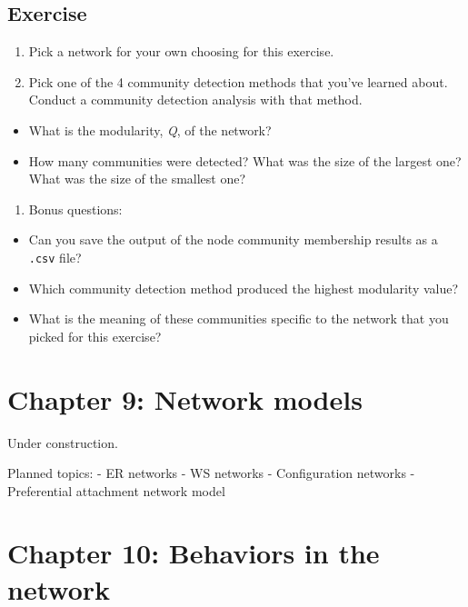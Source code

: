 \documentclass[
]{book}
\providecommand{\tightlist}{%
  \setlength{\itemsep}{0pt}\setlength{\parskip}{0pt}}
\begin{document}
\section{Exercise}\label{exercise-6}

\begin{enumerate}
\def\labelenumi{\arabic{enumi}.}
\item
  Pick a network for your own choosing for this exercise.
\item
  Pick one of the 4 community detection methods that you've learned about. Conduct a community detection analysis with that method.
\end{enumerate}

\begin{itemize}
\tightlist
\item
  What is the modularity, \emph{Q}, of the network?
\item
  How many communities were detected? What was the size of the largest one? What was the size of the smallest one?
\end{itemize}

\begin{enumerate}
\def\labelenumi{\arabic{enumi}.}
\setcounter{enumi}{2}
\tightlist
\item
  Bonus questions:
\end{enumerate}

\begin{itemize}
\tightlist
\item
  Can you save the output of the node community membership results as a \texttt{.csv} file?
\item
  Which community detection method produced the highest modularity value?
\item
  What is the meaning of these communities specific to the network that you picked for this exercise?
\end{itemize}

\chapter{Chapter 9: Network models}\label{ch9}

Under construction.

Planned topics:
- ER networks
- WS networks
- Configuration networks
- Preferential attachment network model

\chapter{Chapter 10: Behaviors in the network}\label{ch10}
\end{document}
